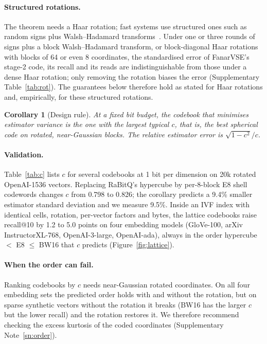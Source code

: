 \documentclass[fleqn,10pt]{wlscirep}
\newtheorem{corollary}{Corollary}
\begin{document}
\paragraph{Structured rotations.} The theorem needs a Haar rotation; fast systems use structured ones such as random signs plus Walsh--Hadamard transforms~\cite{lenhardt2026rslm}. Under one or three rounds of signs plus a block Walsh--Hadamard transform, or block-diagonal Haar rotations with blocks of 64 or even 8 coordinates, the standardised error of FanarVSE's stage-2 code, its recall and its reads are indistinguishable from those under a dense Haar rotation; only removing the rotation biases the error (Supplementary Table~\ref{tab:rot}). The guarantees below therefore hold as stated for Haar rotations and, empirically, for these structured rotations.

\begin{corollary}[Design rule]
At a fixed bit budget, the codebook that minimises estimator variance is the one with the largest typical $c$, that is, the best spherical code on rotated, near-Gaussian blocks. The relative estimator error is $\sqrt{1-c^2}/c$.
\end{corollary}

\paragraph{Validation.} Table~\ref{tab:c} lists $c$ for several codebooks at 1 bit per dimension on 20k rotated OpenAI-1536 vectors. Replacing RaBitQ's hypercube by per-8-block E8 shell codewords changes $c$ from 0.798 to 0.826; the corollary predicts a 9.4\% smaller estimator standard deviation and we measure 9.5\%. Inside an IVF index with identical cells, rotation, per-vector factors and bytes, the lattice codebooks raise recall@10 by 1.2 to 5.0 points on four embedding models (GloVe-100, arXiv InstructorXL-768, OpenAI-3-large, OpenAI-ada), always in the order hypercube $<$ E8 $\le$ BW16 that $c$ predicts (Figure~\ref{fig:lattice}).

\paragraph{When the order can fail.} Ranking codebooks by $c$ needs near-Gaussian rotated coordinates. On all four embedding sets the predicted order holds with and without the rotation, but on sparse synthetic vectors without the rotation it breaks (BW16 has the larger $c$ but the lower recall) and the rotation restores it. We therefore recommend checking the excess kurtosis of the coded coordinates (Supplementary Note~\ref{sn:order}).
\end{document}
